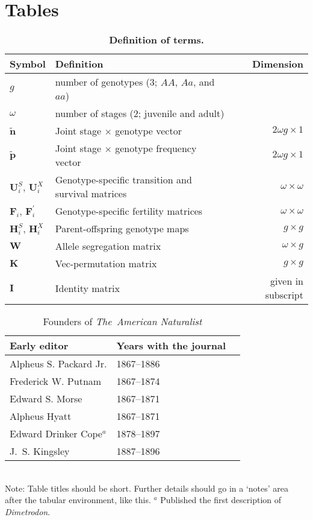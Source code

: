 \documentclass[11pt]{article}
\def\mbf#1{\mathbf{#1}}
\begin{document}
\newpage{}



\section*{Tables}
\renewcommand{\thetable}{\arabic{table}}
\setcounter{table}{0}


\begin{table}[htbp]
\centering
\caption{\bf Definition of terms.}
\label{tab:Terms}
\begin{tabular}{ l l r }
 \toprule
Symbol & Definition & Dimension \\
\hline
$g$      & number of genotypes ($3$; $AA$, $Aa$, and $aa$) & \\
$\omega$ & number of stages ($2$; juvenile and adult) & \\
$\tilde{\mbf{n}}$ & Joint stage $\times$ genotype vector & $2 \omega g \times 1$ \\
$\tilde{\mbf{p}}$ & Joint stage $\times$ genotype frequency vector & $2 \omega g \times 1$ \\

$\mbf{U}^{S}_{i}$, $\mbf{U}^{X}_{i}$ & Genotype-specific transition and survival matrices & $\omega \times \omega$ \\
$\mbf{F}_{i}$, $\mbf{F}^{\prime}_{i}$ & Genotype-specific fertility matrices & $\omega \times \omega$ \\
$\mbf{H}^{S}_{i}$, $\mbf{H}^{X}_{i}$ & Parent-offspring genotype maps & $g \times g$ \\
$\mbf{W}$   & Allele segregation matrix & $\omega \times g$ \\
$\mbf{K}$   & Vec-permutation matrix & $g \times g$ \\
$\mbf{I}$   & Identity matrix & given in subscript \\
\hline
\end{tabular}
\end{table}
\newpage{}




\begin{table}[h]
\caption{Founders of \textit{The~American Naturalist}}
\label{Table:Founders}
\centering
\begin{tabular}{lll}\hline
Early editor            & Years with the journal \\ \hline
Alpheus S. Packard Jr.  & 1867--1886 \\
Frederick W. Putnam     & 1867--1874 \\ 
Edward S. Morse         & 1867--1871 \\ 
Alpheus Hyatt           & 1867--1871 \\
Edward Drinker Cope$^a$ & 1878--1897 \\
J.~S. Kingsley          & 1887--1896 \\ \hline 
\end{tabular}
\bigskip{}
\\
{\footnotesize Note: Table titles should be short. Further details should go in a `notes' area after the tabular environment, like this. $^a$ Published the first description of \textit{Dimetrodon}.}
\end{table}
\end{document}
